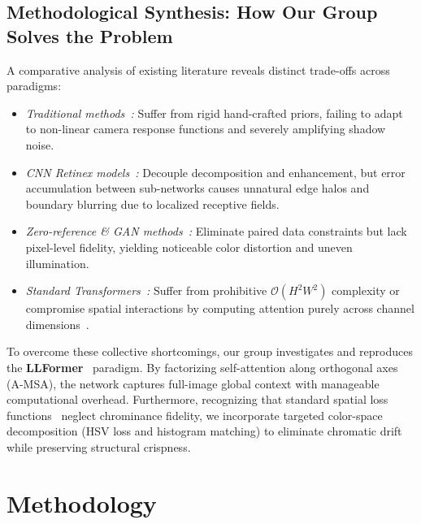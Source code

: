\documentclass[conference]{IEEEtran}
\begin{document}
\subsection{Methodological Synthesis: How Our Group Solves the Problem}
A comparative analysis of existing literature reveals distinct trade-offs across paradigms:
\begin{itemize}
    \item \textit{Traditional methods~\cite{land1971retinex,jobson1997multiscale,dong2011fast,wang2013naturalness,fu2016weighted,guo2016lime,kimmel2003variational,elad2005retinex,ying2017bio,ma2015perceptual}:} Suffer from rigid hand-crafted priors, failing to adapt to non-linear camera response functions and severely amplifying shadow noise.
    \item \textit{CNN Retinex models~\cite{lore2017llnet,wei2018retinexnet,ren2018joint,chen2018learning,zhang2019kind,xu2018structure,lv2018mbllen}:} Decouple decomposition and enhancement, but error accumulation between sub-networks causes unnatural edge halos and boundary blurring due to localized receptive fields.
    \item \textit{Zero-reference \& GAN methods~\cite{guo2020zero,li2021learning,jiang2021enlightengan,chen2018deep}:} Eliminate paired data constraints but lack pixel-level fidelity, yielding noticeable color distortion and uneven illumination.
    \item \textit{Standard Transformers~\cite{chen2021pre,liu2021swin,liang2021swinir,zamir2022restormer,wang2022uformer}:} Suffer from prohibitive $\mathcal{O}(H^2W^2)$ complexity or compromise spatial interactions by computing attention purely across channel dimensions~\cite{zamir2022restormer}.
\end{itemize}
To overcome these collective shortcomings, our group investigates and reproduces the \textbf{LLFormer}~\cite{wang2023llformer} paradigm. By factorizing self-attention along orthogonal axes (A-MSA), the network captures full-image global context with manageable computational overhead. Furthermore, recognizing that standard spatial loss functions~\cite{zhao2016loss} neglect chrominance fidelity, we incorporate targeted color-space decomposition (HSV loss and histogram matching) to eliminate chromatic drift while preserving structural crispness.

\section{Methodology}
\label{sec:method}
\end{document}
